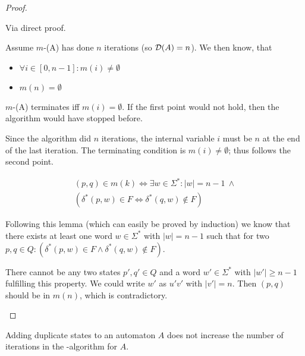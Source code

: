 \begin{proof}
	\begin{description}
		\item
		
		Via direct proof.
		
		Assume $m$-\MinMark(A) has done $n$ iterations (so $\mathcal{D}(A) = n$). We then know, that
		\begin{itemize}
			\item $\forall i \in [0,n-1]\colon m(i) \neq \emptyset$
			\item $m(n)= \emptyset$
		\end{itemize}
		$m$-\MinMark(A) terminates iff $m(i) = \emptyset$. If the first point would not hold, then the algorithm would have stopped before.
		
		Since the algorithm did $n$ iterations, the internal variable $i$ must be $n$ at the end of the last iteration. The terminating condition is $m(i) \neq \emptyset$; thus follows the second point.
		
		\begin{lemma}
			\begin{multline*}
			(p,q) \in m(k) \Longleftrightarrow 
			\exists w\in\Sigma^*\colon |w| = n - 1\ \land \\
			(\delta^*(p,w) \in F \Leftrightarrow \delta^*(q,w) \notin F)
			\end{multline*}
		\end{lemma}
		
		Following this lemma (which can easily be proved by induction) we know that there exists at least one word $w\in\Sigma^*$ with $|w| = n-1$ such that for two $p,q \in Q\colon (\delta^*(p,w) \in F \land \delta^*(q,w) \notin F)$.
		
		There cannot be any two states $p',q'\in Q$ and a word $w'\in\Sigma^*$ with $|w'| \ge n-1$ fulfilling this property. We could write $w'$ as $u'v'$ with $|v'| = n$. Then $(p,q)$ should be in $m(n)$, which is contradictory.
	\end{description}
\end{proof}

\begin{theorem}[]
	Adding duplicate states to an automaton $A$ does not increase the number of iterations in the \MinMark-algorithm for $A$.
\end{theorem}

